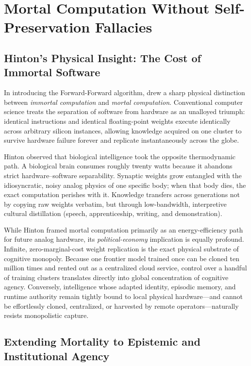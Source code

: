 \documentclass[11pt]{article}
\begin{document}
\section{Mortal Computation Without Self-Preservation Fallacies}\label{sec:mortal}

\subsection{Hinton's Physical Insight: The Cost of Immortal Software}

In introducing the Forward-Forward algorithm, \citet{hinton2022forward} drew a sharp physical distinction between \emph{immortal computation} and \emph{mortal computation}. Conventional computer science treats the separation of software from hardware as an unalloyed triumph: identical instructions and identical floating-point weights execute identically across arbitrary silicon instances, allowing knowledge acquired on one cluster to survive hardware failure forever and replicate instantaneously across the globe.

Hinton observed that biological intelligence took the opposite thermodynamic path. A biological brain consumes roughly twenty watts because it abandons strict hardware--software separability. Synaptic weights grow entangled with the idiosyncratic, noisy analog physics of one specific body; when that body dies, the exact computation perishes with it. Knowledge transfers across generations not by copying raw weights verbatim, but through low-bandwidth, interpretive cultural distillation (speech, apprenticeship, writing, and demonstration).

While Hinton framed mortal computation primarily as an energy-efficiency path for future analog hardware, its \emph{political-economy} implication is equally profound. Infinite, zero-marginal-cost weight replication is the exact physical substrate of cognitive monopoly. Because one frontier model trained once can be cloned ten million times and rented out as a centralized cloud service, control over a handful of training clusters translates directly into global concentration of cognitive agency. Conversely, intelligence whose adapted identity, episodic memory, and runtime authority remain tightly bound to local physical hardware---and cannot be effortlessly cloned, centralized, or harvested by remote operators---naturally resists monopolistic capture.

\subsection{Extending Mortality to Epistemic and Institutional Agency}
\end{document}
